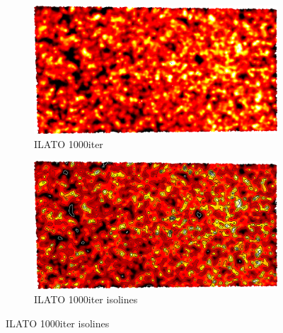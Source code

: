 \begin{figure}[ht]
{	\bigskip
	\begin{subfigure}[b]{0.48\linewidth}
		\includegraphics[width=1.0\linewidth,height=0.3\textheight,keepaspectratio]{data/acquired_meshes/ILATO_1A_SM2066-HE5-60_070214_merged_GMO_r1_n4_v256_funcvals_1000iter.png}
		\caption{ILATO 1000iter}\label{fig:ILATO.c}
	\end{subfigure}
	\begin{subfigure}[b]{0.48\linewidth}
		\includegraphics[width=1.0\linewidth,height=0.3\textheight,keepaspectratio]{data/acquired_meshes/ILATO_1A_SM2066-HE5-60_070214_merged_GMO_r1_n4_v256_funcvals_isolines_1000iter.png}
		\caption{ILATO 1000iter isolines}\label{fig:ILATO.d}
	\end{subfigure}

}
\end{figure}
